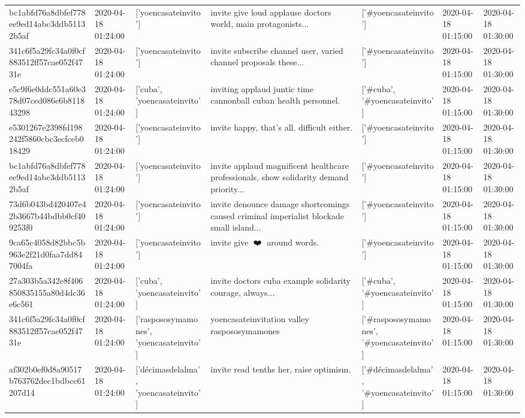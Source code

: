\begin{tabular}{lllllll}
bc1abfd76a8dbfef778ee9ed14abc3ddb51132b5af & 2020-04-18 01:24:00 & ['yoencasateinvito'] & invite give loud applause doctors world, main protagonists... & ['#yoencasateinvito'] & 2020-04-18 01:15:00 & 2020-04-18 01:30:00 \\
341c6f5a29fc34a0f0cf883512ff57cae052f4731e & 2020-04-18 01:24:00 & ['yoencasateinvito'] & invite subscribe channel user, varied channel proposals these... & ['#yoencasateinvito'] & 2020-04-18 01:15:00 & 2020-04-18 01:30:00 \\
e5c9f6e0ddc551a60e378d07ced086e6b811843298 & 2020-04-18 01:24:00 & ['cuba', 'yoencasateinvito'] & inviting applaud juntic time cannonball cuban health personnel. & ['#cuba', '#yoencasateinvito'] & 2020-04-18 01:15:00 & 2020-04-18 01:30:00 \\
e5301267e2398fd198242f5860cbc3ecfceb018429 & 2020-04-18 01:24:00 & ['yoencasateinvito'] & invite happy, that's all. difficult either. & ['#yoencasateinvito'] & 2020-04-18 01:15:00 & 2020-04-18 01:30:00 \\
bc1abfd76a8dbfef778ee9ed14abc3ddb51132b5af & 2020-04-18 01:24:00 & ['yoencasateinvito'] & invite applaud magnificent healthcare professionals, show solidarity demand priority... & ['#yoencasateinvito'] & 2020-04-18 01:15:00 & 2020-04-18 01:30:00 \\
73d6b043bd420407e42b3667b44bdbb0cf409253f0 & 2020-04-18 01:24:00 & ['yoencasateinvito'] & invite denounce damage shortcomings caused criminal imperialist blockade small island... & ['#yoencasateinvito'] & 2020-04-18 01:15:00 & 2020-04-18 01:30:00 \\
9ca65c4058d82bbc5b963e2f21d0faa7dd847004fa & 2020-04-18 01:24:00 & ['yoencasateinvito'] & invite give 💚❤️💜 around words. & ['#yoencasateinvito'] & 2020-04-18 01:15:00 & 2020-04-18 01:30:00 \\
27a303b5a342e8f406850835155a80d4dc36e6c561 & 2020-04-18 01:24:00 & ['cuba', 'yoencasateinvito'] & invite doctors cuba example solidarity courage, always... & ['#cuba', '#yoencasateinvito'] & 2020-04-18 01:15:00 & 2020-04-18 01:30:00 \\
341c6f5a29fc34a0f0cf883512ff57cae052f4731e & 2020-04-18 01:24:00 & ['raspososymamones', 'yoencasateinvito'] & yoencasateinvitation valley raspososymamones & ['#raspososymamones', '#yoencasateinvito'] & 2020-04-18 01:15:00 & 2020-04-18 01:30:00 \\
af302b0ef0d8a90517b763762dec1bdbcc61207d14 & 2020-04-18 01:24:00 & ['décimasdelalma', 'yoencasateinvito'] & invite read tenths her, raise optimism. & ['#décimasdelalma', '#yoencasateinvito'] & 2020-04-18 01:15:00 & 2020-04-18 01:30:00 \\

\end{tabular}
